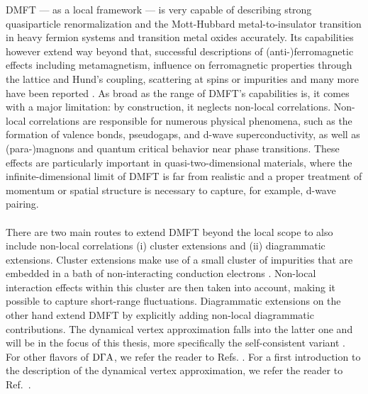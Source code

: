\documentclass[../../main.tex]{subfiles}
\begin{document}
DMFT --- as a local framework --- is very capable of describing strong quasiparticle renormalization and the Mott-Hubbard metal-to-insulator transition in heavy fermion systems and transition metal oxides accurately. Its capabilities however extend way beyond that, successful descriptions of (anti-)ferromagnetic effects including metamagnetism, influence on ferromagnetic properties through the lattice and Hund's coupling, scattering at spins or impurities and many more have been reported \cite{Held2007, Kotliar2006}. As broad as the range of DMFT's capabilities is, it comes with a major limitation: by construction, it neglects non-local correlations. Non-local correlations are responsible for numerous physical phenomena, such as the formation of valence bonds, pseudogaps, and d-wave superconductivity, as well as (para-)magnons and quantum critical behavior near phase transitions. These effects are particularly important in quasi-two-dimensional materials, where the infinite-dimensional limit of DMFT is far from realistic and a proper treatment of momentum or spatial structure is necessary to capture, for example, d-wave pairing.
\\\\
There are two main routes to extend DMFT beyond the local scope to also include non-local correlations \cite{Rohringer2012} (i) cluster extensions and (ii) diagrammatic extensions. Cluster extensions make use of a small cluster of impurities that are embedded in a bath of non-interacting conduction electrons \cite{Slezak2009}. Non-local interaction effects within this cluster are then taken into account, making it possible to capture short-range fluctuations. Diagrammatic extensions on the other hand extend DMFT by explicitly adding non-local diagrammatic contributions. The dynamical vertex approximation falls into the latter one and will be in the focus of this thesis, more specifically the self-consistent  variant \cite{Kaufmann2021}. For other flavors of $\text{D}\Gamma\text{A}$, we refer the reader to Refs. \cite{DelRe2021, Valli2015, Schafer2021, Katanin2009, Held2008, Stobbe2022, Augustinsky2011, Tam2013}. For a first introduction to the  description of the dynamical vertex approximation, we refer the reader to Ref.~\cite{Toschi2007}. 
\\\\
\end{document}

